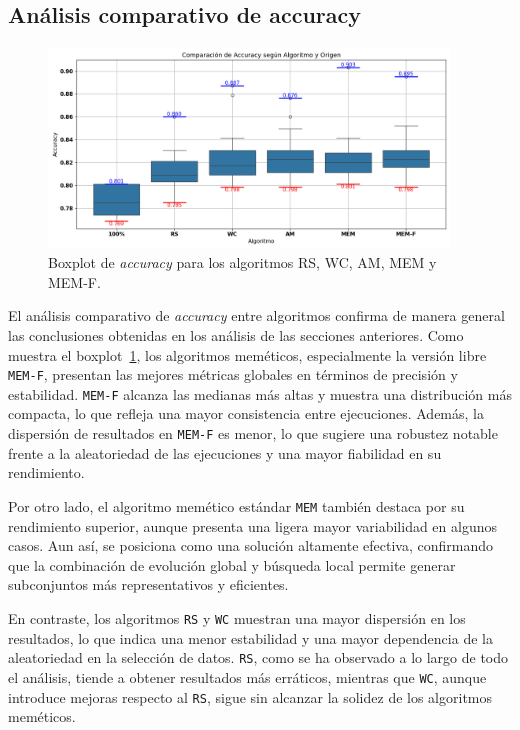 \subsection{Análisis comparativo de accuracy}\label{sec:comparacion-final-accuracy}
\begin{figure}[htp]
    \centering
    \includegraphics[width=0.95\textwidth]{imagenes/evaluaciones/final/boxplot-por-algoritmo}
    \caption{Boxplot de \textit{accuracy} para los algoritmos RS, WC, AM, MEM y MEM-F.}
    \label{fig:boxplot-comparacion-final}
\end{figure}
El análisis comparativo de \textit{accuracy} entre algoritmos confirma de manera general las conclusiones obtenidas en los análisis de las secciones anteriores.
Como muestra el boxplot~\ref{fig:boxplot-comparacion-final}, los algoritmos meméticos, especialmente la versión libre \texttt{MEM-F},
presentan las mejores métricas globales en términos de precisión y estabilidad.
\texttt{MEM-F} alcanza las medianas más altas y muestra una distribución más compacta, lo que refleja una mayor consistencia entre ejecuciones.
Además, la dispersión de resultados en \texttt{MEM-F} es menor, lo que sugiere una robustez notable frente a la aleatoriedad de las ejecuciones y una mayor fiabilidad en su rendimiento.

Por otro lado, el algoritmo memético estándar \texttt{MEM} también destaca por su rendimiento superior,
aunque presenta una ligera mayor variabilidad en algunos casos.
Aun así, se posiciona como una solución altamente efectiva,
confirmando que la combinación de evolución global y búsqueda local permite generar subconjuntos más representativos y eficientes.

En contraste, los algoritmos \texttt{RS} y \texttt{WC} muestran una mayor dispersión en los resultados,
lo que indica una menor estabilidad y una mayor dependencia de la aleatoriedad en la selección de datos.
\texttt{RS}, como se ha observado a lo largo de todo el análisis, tiende a obtener resultados más erráticos, mientras que \texttt{WC},
aunque introduce mejoras respecto al \texttt{RS}, sigue sin alcanzar la solidez de los algoritmos meméticos.

